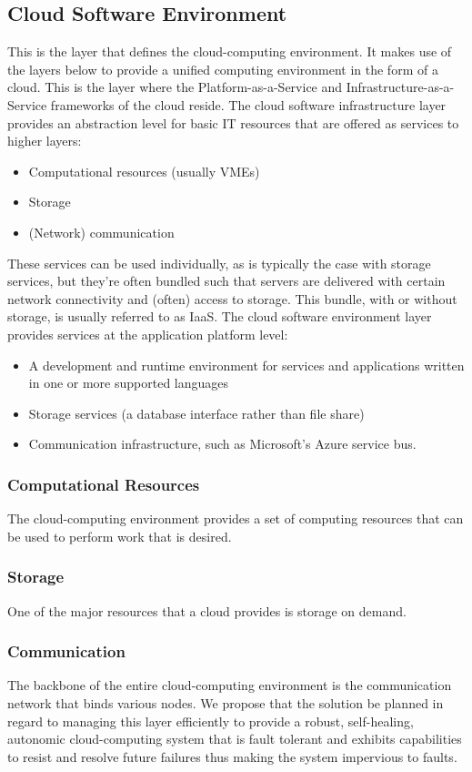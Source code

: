 \subsection{Cloud Software Environment}
This is the layer that defines the cloud-computing environment. It makes use of the layers below to provide a unified computing environment in the form of a cloud. This is the layer where the Platform-as-a-Service and Infrastructure-as-a-Service frameworks of the cloud reside.
The cloud software infrastructure layer provides an abstraction level for basic IT resources that are offered as services to higher layers:
	\begin{itemize}
		\item Computational resources (usually VMEs)
		\item Storage
		\item (Network) communication
	\end{itemize}
These services can be used individually, as is typically the case with storage services, but they’re often bundled such that servers are delivered with certain network connectivity and (often) access to storage. This bundle, with or without storage, is usually referred to as IaaS.
The cloud software environment layer provides services at the application platform level: 
	\begin{itemize}
		\item A development and runtime environment for services and applications written in one or more supported languages
		\item Storage services (a database interface rather than file share)
		\item Communication infrastructure, such as Microsoft’s Azure service bus.
	\end{itemize}
\subsubsection{Computational Resources}
The cloud-computing environment provides a set of computing resources that can be used to perform work that is desired.
\subsubsection{Storage}
One of the major resources that a cloud provides is storage on demand.
\subsubsection{Communication}
The backbone of the entire cloud-computing environment is the communication network that binds various nodes.
We propose that the solution be planned in regard to managing this layer efficiently to provide a robust, self-healing, autonomic cloud-computing system that is fault tolerant and exhibits capabilities to resist and resolve future failures thus making the system impervious to faults.

